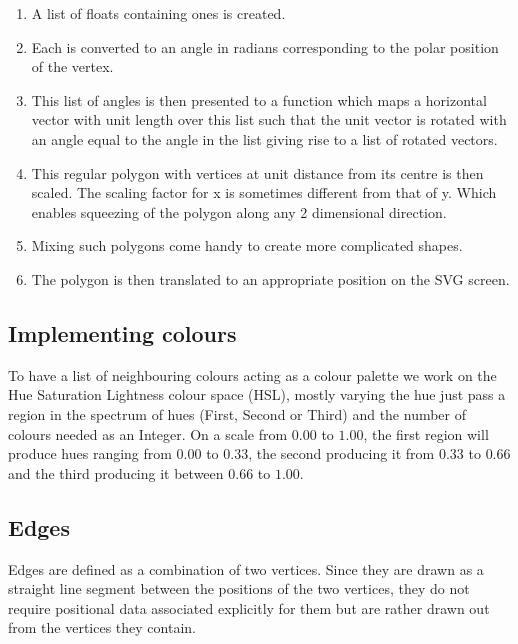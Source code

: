 \begin{enumerate}
\item A list of floats containing ones is created. 

\item Each is converted to an angle in radians corresponding
to the polar position of the vertex. 

\item This list of angles is then presented to
a function which maps a horizontal vector with unit length over this list
such that the unit vector is rotated with an angle equal to the angle in the
list giving rise to a list of rotated vectors.

\item This regular polygon with vertices at unit distance from its centre is
then scaled. The scaling factor for x is sometimes different from that of y.
Which enables squeezing of the polygon along any 2 dimensional direction.

\item Mixing such polygons come handy to create more complicated shapes.

\item The polygon is then translated to an appropriate position on the SVG screen.

\end{enumerate}

\subsection{Implementing colours}
To have a list of neighbouring colours acting as a colour palette we work on the
Hue Saturation Lightness colour space (HSL), mostly varying the hue just pass a
region in the spectrum of hues (First, Second or Third) and the number of
colours needed as an Integer. On a scale from $0.00$ to $1.00$, the first region
will produce hues ranging from $0.00$ to $0.33$, the second producing it from
$0.33$ to $0.66$ and the third producing it between $0.66$ to $1.00$.

\subsection{Edges}
Edges are defined as a combination of two vertices. Since they are drawn as a
straight line segment between the positions of the two vertices, they do not require
positional data associated explicitly for them but are rather drawn out from the vertices
they contain.

